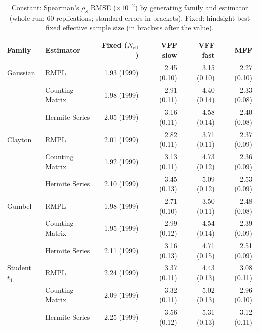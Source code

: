 \begin{table}[htbp]
\centering
\small
\caption{Constant: Spearman's $\rho_S$ RMSE ($\times10^{-2}$) by generating family and estimator (whole run; 60 replications; standard errors in brackets). Fixed: hindsight-best fixed effective sample size (in brackets after the value).}
\label{tab:app-strategy-rmse-constant}
\begin{tabular}{llrrrr}
\toprule
Family & Estimator & Fixed ($N_{\mathrm{eff}}$) & VFF slow & VFF fast & MFF \\
\midrule
Gaussian & RMPL & 1.93 (1999) & 2.45 (0.10) & 3.15 (0.10) & 2.27 (0.10) \\
 & Counting Matrix & 1.98 (1999) & 2.91 (0.11) & 4.40 (0.14) & 2.33 (0.08) \\
 & Hermite Series & 2.05 (1999) & 3.16 (0.11) & 4.58 (0.14) & 2.40 (0.08) \\
\addlinespace
Clayton & RMPL & 2.01 (1999) & 2.82 (0.11) & 3.71 (0.11) & 2.37 (0.09) \\
 & Counting Matrix & 1.92 (1999) & 3.13 (0.11) & 4.73 (0.12) & 2.36 (0.09) \\
 & Hermite Series & 2.10 (1999) & 3.45 (0.13) & 5.09 (0.12) & 2.53 (0.09) \\
\addlinespace
Gumbel & RMPL & 1.98 (1999) & 2.71 (0.10) & 3.50 (0.11) & 2.48 (0.08) \\
 & Counting Matrix & 1.95 (1999) & 2.99 (0.12) & 4.54 (0.14) & 2.39 (0.09) \\
 & Hermite Series & 2.11 (1999) & 3.16 (0.13) & 4.71 (0.15) & 2.51 (0.09) \\
\addlinespace
Student $t_4$ & RMPL & 2.24 (1999) & 3.37 (0.11) & 4.43 (0.13) & 3.08 (0.11) \\
 & Counting Matrix & 2.09 (1999) & 3.32 (0.11) & 5.02 (0.13) & 2.96 (0.10) \\
 & Hermite Series & 2.25 (1999) & 3.56 (0.12) & 5.31 (0.13) & 3.12 (0.11) \\
\bottomrule
\end{tabular}
\end{table}

